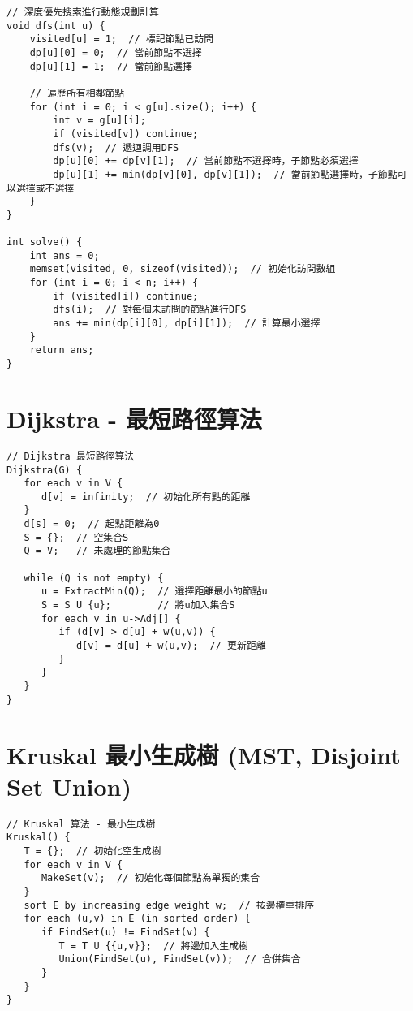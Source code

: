 \documentclass{article}
\begin{document}
\begin{multicols}{2}
\begin{lstlisting}
// 深度優先搜索進行動態規劃計算
void dfs(int u) {
    visited[u] = 1;  // 標記節點已訪問
    dp[u][0] = 0;  // 當前節點不選擇
    dp[u][1] = 1;  // 當前節點選擇

    // 遍歷所有相鄰節點
    for (int i = 0; i < g[u].size(); i++) {
        int v = g[u][i];
        if (visited[v]) continue;
        dfs(v);  // 遞迴調用DFS
        dp[u][0] += dp[v][1];  // 當前節點不選擇時，子節點必須選擇
        dp[u][1] += min(dp[v][0], dp[v][1]);  // 當前節點選擇時，子節點可以選擇或不選擇
    }
}

int solve() {
    int ans = 0;
    memset(visited, 0, sizeof(visited));  // 初始化訪問數組
    for (int i = 0; i < n; i++) {
        if (visited[i]) continue;
        dfs(i);  // 對每個未訪問的節點進行DFS
        ans += min(dp[i][0], dp[i][1]);  // 計算最小選擇
    }
    return ans;
}
\end{lstlisting}

\section{Dijkstra - 最短路徑算法}

\begin{lstlisting}
// Dijkstra 最短路徑算法
Dijkstra(G) {
   for each v in V {
      d[v] = infinity;  // 初始化所有點的距離
   }
   d[s] = 0;  // 起點距離為0
   S = {};  // 空集合S
   Q = V;   // 未處理的節點集合

   while (Q is not empty) {
      u = ExtractMin(Q);  // 選擇距離最小的節點u
      S = S U {u};        // 將u加入集合S
      for each v in u->Adj[] {
         if (d[v] > d[u] + w(u,v)) {
            d[v] = d[u] + w(u,v);  // 更新距離
         }
      }
   }
}
\end{lstlisting}

\section{Kruskal 最小生成樹 (MST, Disjoint Set Union)}

\begin{lstlisting}
// Kruskal 算法 - 最小生成樹
Kruskal() {
   T = {};  // 初始化空生成樹
   for each v in V {
      MakeSet(v);  // 初始化每個節點為單獨的集合
   }
   sort E by increasing edge weight w;  // 按邊權重排序
   for each (u,v) in E (in sorted order) {
      if FindSet(u) != FindSet(v) {
         T = T U {{u,v}};  // 將邊加入生成樹
         Union(FindSet(u), FindSet(v));  // 合併集合
      }
   }
}
\end{lstlisting}


\end{multicols}
\end{document}
